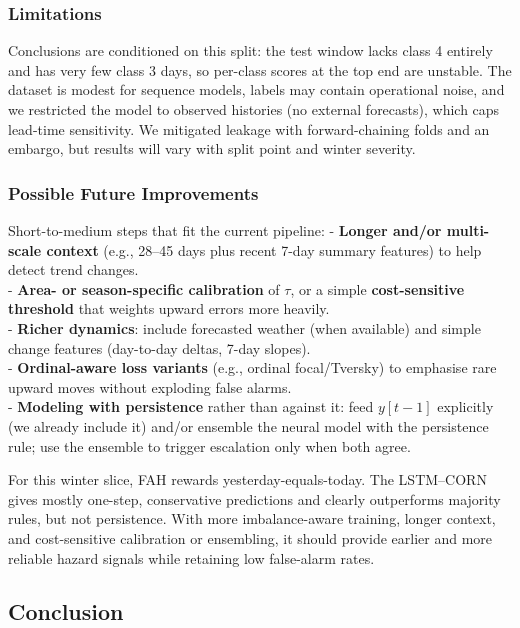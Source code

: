 \documentclass[
  letterpaper,
  DIV=11,
  numbers=noendperiod]{scrartcl}
\begin{document}
\subsubsection{Limitations}\label{limitations}

Conclusions are conditioned on this split: the test window lacks class 4
entirely and has very few class 3 days, so per-class scores at the top
end are unstable. The dataset is modest for sequence models, labels may
contain operational noise, and we restricted the model to observed
histories (no external forecasts), which caps lead-time sensitivity. We
mitigated leakage with forward-chaining folds and an embargo, but
results will vary with split point and winter severity.

\subsubsection{Possible Future
Improvements}\label{possible-future-improvements}

Short-to-medium steps that fit the current pipeline: - \textbf{Longer
and/or multi-scale context} (e.g., 28--45 days plus recent 7-day summary
features) to help detect trend changes.\\
- \textbf{Area- or season-specific calibration} of \(\tau\), or a simple
\textbf{cost-sensitive threshold} that weights upward errors more
heavily.\\
- \textbf{Richer dynamics}: include forecasted weather (when available)
and simple change features (day-to-day deltas, 7-day slopes).\\
- \textbf{Ordinal-aware loss variants} (e.g., ordinal focal/Tversky) to
emphasise rare upward moves without exploding false alarms.\\
- \textbf{Modeling with persistence} rather than against it: feed
\(y[t-1]\) explicitly (we already include it) and/or ensemble the neural
model with the persistence rule; use the ensemble to trigger escalation
only when both agree.

For this winter slice, FAH rewards yesterday-equals-today. The
LSTM--CORN gives mostly one-step, conservative predictions and clearly
outperforms majority rules, but not persistence. With more
imbalance-aware training, longer context, and cost-sensitive calibration
or ensembling, it should provide earlier and more reliable hazard
signals while retaining low false-alarm rates.

\subsection{Conclusion}\label{conclusion}
\end{document}
